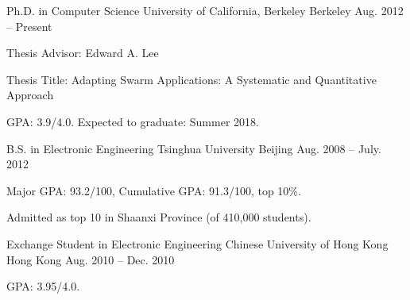 

\begin{cventries}

  \cventry
  {Ph.D. in Computer Science}
  {University of California, Berkeley}
  {Berkeley}
  {Aug. 2012 -- Present}
  {
    \begin{cvitems}
    \item Thesis Advisor: Edward A. Lee
    \item Thesis Title: Adapting Swarm Applications: A Systematic and
      Quantitative Approach
    \item GPA: 3.9/4.0. Expected to graduate: Summer 2018.
    \end{cvitems}
  }

  \cventry
  {B.S. in Electronic Engineering}
  {Tsinghua University}
  {Beijing}
  {Aug. 2008 -- July. 2012}
  {
    \begin{cvitems}
    \item{Major GPA: 93.2/100, Cumulative GPA: 91.3/100, top 10\%.}
    \item{Admitted as top 10 in Shaanxi Province (of 410,000 students).}
    \end{cvitems}
  }

  \cventry
  {Exchange Student in Electronic Engineering}
  {Chinese University of Hong Kong}
  {Hong Kong}
  {Aug. 2010 -- Dec. 2010}
  {
    \begin{cvitems}
    \item {GPA: 3.95/4.0.}
    \end{cvitems}
  }

\end{cventries}

